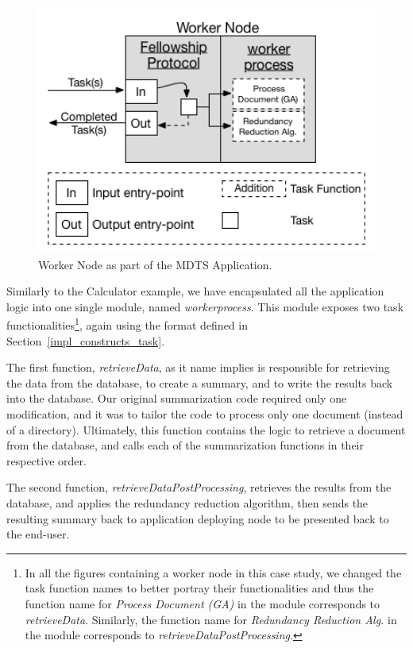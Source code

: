 \documentclass[12pt, titlepage]{uo_temp}
\begin{document}
     \begin{figure}[h!]
       \centering
       \includegraphics[width=125mm]{images/mdts_worker.png}
       \caption{Worker Node as part of the MDTS Application.}
     \end{figure}

     Similarly to the Calculator example, we have encapsulated all the application logic
     into one single module, named \emph{workerprocess}. This module exposes two task
     functionalities\footnote{In all the figures containing a worker node in this case
       study, we changed the task function names to better portray their functionalities
       and thus the function name for \emph{Process Document (GA)} in the module
       corresponds to \emph{retrieveData}. Similarly, the function name for
       \emph{Redundancy Reduction Alg.} in the module corresponds to
       \emph{retrieveDataPostProcessing}.}, again using the format defined in
     Section~\ref{impl_constructs_task}.

     The first function, \emph{retrieveData}, as it name implies is responsible for
     retrieving the data from the database, to create a summary, and to write the results
     back into the database. Our original summarization code required only one
     modification, and it was to tailor the code to process only one document (instead of
     a directory). Ultimately, this function contains the logic to retrieve a document from
     the database, and calls each of the summarization functions in their respective
     order.

     The second function, \emph{retrieveDataPostProcessing}, retrieves the results from
     the database, and applies the redundancy reduction algorithm, then sends the
     resulting summary back to application deploying node to be presented back to the end-user.
\end{document}

